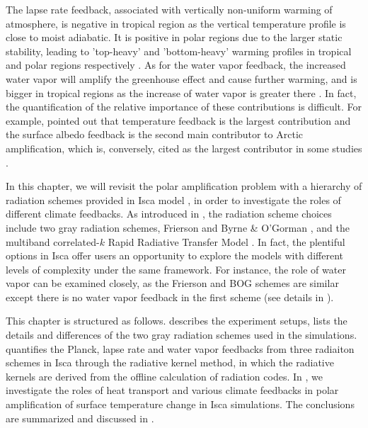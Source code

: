 The lapse rate feedback, associated with vertically non-uniform warming of atmosphere, is negative in tropical region as the vertical temperature profile is close to moist adiabatic. It is positive in polar regions due to the larger static stability, leading to 'top-heavy' and 'bottom-heavy' warming profiles in tropical and polar regions respectively \citep{Graversen2009, Pithan2014, Manabe1975, Kim2018}. As for the water vapor feedback, the increased water vapor will amplify the greenhouse effect and cause further warming, and is bigger in tropical regions as the increase of water vapor is greater there \citep{Taylor2013, Pithan2014}. In fact, the quantification of the relative importance of these contributions is difficult. For example, \cite{Pithan2014} pointed out that temperature feedback is the largest contribution and the surface albedo feedback is the second main contributor to Arctic amplification, which is, conversely, cited as the largest contributor in some studies \citep[e.g.,][]{Manabe1975,Winton2006amplified,Hall2004}.


In this chapter, we will revisit the polar amplification problem with a hierarchy of radiation schemes provided in Isca model \citep{Vallis2018}, in order to investigate the roles of different climate feedbacks. As introduced in , the radiation scheme choices include two gray radiation schemes, Frierson \citep{Frierson2006} and Byrne \& O'Gorman \citep[BOG hereafter;][]{Byrne2013}, and the multiband correlated-$k$ Rapid Radiative Transfer Model \citep[RRTM;][]{Clough2005}. In fact, the plentiful options in Isca offer users an opportunity to explore the models with different levels of complexity under the same framework. For instance, the role of water vapor can be examined closely, as the Frierson and BOG schemes are similar except there is no water vapor feedback in the first scheme (see details in ).

This chapter is structured as follows.  describes the experiment setups, lists the details and differences of the two gray radiation schemes used in the simulations.  quantifies the Planck, lapse rate and water vapor feedbacks from three radiaiton schemes in Isca through the radiative kernel method, in which the radiative kernels are derived from the offline calculation of radiation codes. In , we investigate the roles of heat transport and various climate feedbacks in polar amplification of surface temperature change in Isca simulations. The conclusions are summarized and discussed in .

